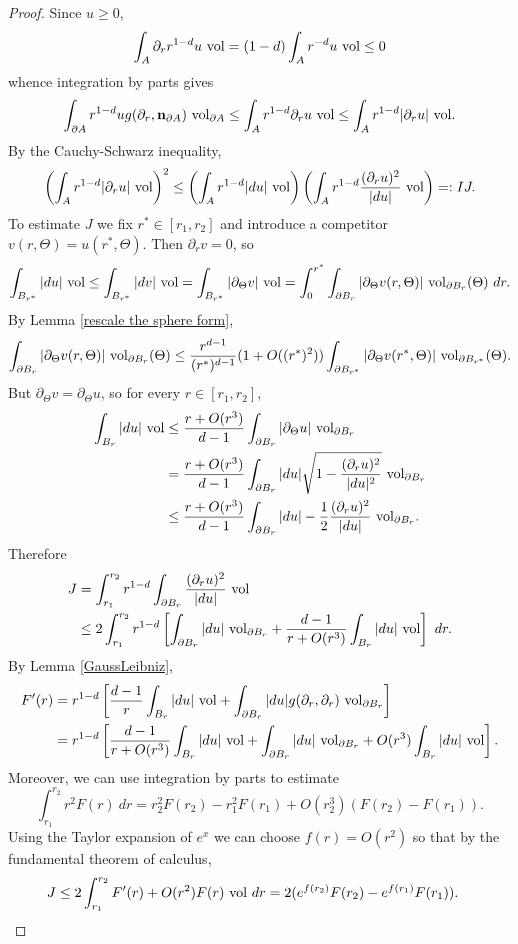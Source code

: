 \begin{proof}
Since $u \geq 0$,
$$\int_A \partial_r  r^{1 - d}u ~\mathrm{vol} = (1 - d)\int_A r^{-d}u ~\mathrm{vol} \leq 0$$
whence integration by parts gives
$$\int_{\partial A} r^{1 - d} u g(\partial_r, \mathbf n_{\partial A}) ~\mathrm{vol}_{\partial A} \leq \int_A r^{1 - d} \partial_r u ~\mathrm{vol} \leq \int_A r^{1 - d} |\partial_r u| ~\mathrm{vol}.$$
By the Cauchy-Schwarz inequality,
\begin{equation}\label{monotonicity CauchySchwarz}
\left(\int_A r^{1 - d} |\partial_r u| ~\mathrm{vol} \right)^2 \leq \left(\int_A r^{1 - d}|du|~\mathrm{vol}\right)\left(\int_A r^{1 - d}\frac{(\partial_ru)^2}{|du|} ~\mathrm{vol}\right) =: IJ.
\end{equation}
To estimate $J$ we fix $r^* \in [r_1, r_2]$ and introduce a competitor $v(r, \Theta) = u(r^*, \Theta)$. Then $\partial_r v = 0$, so
$$\int_{B_{r^*}} |du| ~\mathrm{vol} \leq \int_{B_{r^*}} |dv| ~\mathrm{vol} = \int_{B_{r^*}} |\partial_\Theta v| ~\mathrm{vol} = \int_0^{r^*} \int_{\partial B_r} |\partial_\Theta v(r, \Theta)| ~\mathrm{vol}_{\partial B_r}(\Theta) ~dr.$$
By Lemma \ref{rescale the sphere form},
$$\int_{\partial B_r} |\partial_\Theta v(r, \Theta)| ~\mathrm{vol}_{\partial B_r}(\Theta) \leq \frac{r^{d - 1}}{(r^*)^{d - 1}}(1 + O((r^*)^2)) \int_{\partial B_{r^*}} |\partial_\Theta v(r^*, \Theta)| ~\mathrm{vol}_{\partial B_{r^*}}(\Theta).$$
But $\partial_\Theta v = \partial_\Theta u$, so for every $r \in [r_1, r_2]$,
\begin{align*}
\int_{B_r} |du| ~\mathrm{vol} &\leq \frac{r + O(r^3)}{d - 1} \int_{\partial B_r} |\partial_\Theta u| ~\mathrm{vol}_{\partial B_r}\\
&= \frac{r + O(r^3)}{d - 1} \int_{\partial B_r} |du| \sqrt{1 - \frac{(\partial_r u)^2}{|du|^2}} ~\mathrm{vol}_{\partial B_r} \\
&\leq \frac{r + O(r^3)}{d - 1} \int_{\partial B_r} |du| - \frac{1}{2} \frac{(\partial_r u)^2}{|du|} ~\mathrm{vol}_{\partial B_r}.
\end{align*}
Therefore
\begin{align*}
J &= \int_{r_1}^{r_2} r^{1 - d} \int_{\partial B_r} \frac{(\partial_r u)^2}{|du|} ~\mathrm{vol} \\
&\leq 2 \int_{r_1}^{r_2} r^{1 - d} \left[\int_{\partial B_r} |du| ~\mathrm{vol}_{\partial B_r} + \frac{d - 1}{r + O(r^3)} \int_{B_r} |du| ~\mathrm{vol}\right] ~dr.
\end{align*}
By Lemma \ref{GaussLeibniz},
\begin{align*}
F'(r) &= r^{1 - d}\left[\frac{d - 1}{r} \int_{B_r} |du| ~\mathrm{vol} + \int_{\partial B_r} |du| g(\partial_r, \partial_r) ~\mathrm{vol}_{\partial B_r}\right]\\
&= r^{1 - d}\left[\frac{d - 1}{r + O(r^3)} \int_{B_r} |du| ~\mathrm{vol} + \int_{\partial B_r} |du| ~\mathrm{vol}_{\partial B_r} + O(r^3) \int_{B_r}|du| ~\mathrm{vol}\right].
\end{align*}
Moreover, we can use integration by parts to estimate
$$\int_{r_1}^{r_2} r^2 F(r) ~dr = r_2^2 F(r_2) - r_1^2 F(r_1) + O(r_2^3)(F(r_2) - F(r_1)).$$
Using the Taylor expansion of $e^x$ we can choose $f(r) = O(r^2)$ so that by the fundamental theorem of calculus,
\begin{align*}
J &\leq 2\int_{r_1}^{r_2} F'(r) + O(r^2)F(r) ~\mathrm{vol} ~dr = 2(e^{f(r_2)} F(r_2) - e^{f(r_1)} F(r_1)).
\end{align*}


\end{proof}
